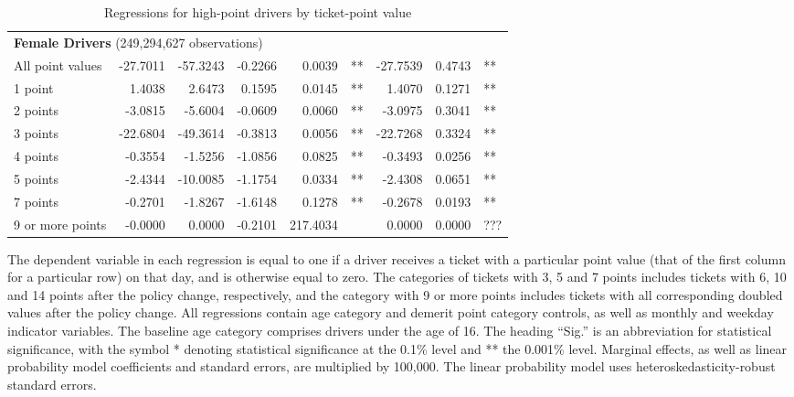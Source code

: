 \begin{table}
\begin{tabular}{l r r r r l r r l}
\hline 

\multicolumn{8}{l}{\textbf{Female Drivers} (249,294,627 observations)} \\ 

All point values                &  -27.7011        &  -57.3243       &  -0.2266        &  0.0039       &   **       &  -27.7539        &  0.4743       &   **       \\ 
1 point                         &  1.4038        &  2.6473       &  0.1595        &  0.0145       &   **       &  1.4070        &  0.1271       &   **       \\ 
2 points                        &  -3.0815        &  -5.6004       &  -0.0609        &  0.0060       &   **       &  -3.0975        &  0.3041       &   **       \\ 
3 points                        &  -22.6804        &  -49.3614       &  -0.3813        &  0.0056       &   **       &  -22.7268        &  0.3324       &   **       \\ 
4 points                        &  -0.3554        &  -1.5256       &  -1.0856        &  0.0825       &   **       &  -0.3493        &  0.0256       &   **       \\ 
5 points                        &  -2.4344        &  -10.0085       &  -1.1754        &  0.0334       &   **       &  -2.4308        &  0.0651       &   **       \\ 
7 points                        &  -0.2701        &  -1.8267       &  -1.6148        &  0.1278       &   **       &  -0.2678        &  0.0193       &   **       \\ 
9 or more points                &  -0.0000        &  0.0000       &  -0.2101        &  217.4034       &            &  0.0000        &  0.0000       &  ???       \\ 

\hline 

\end{tabular} 
\caption{Regressions for high-point drivers by ticket-point value} 
The dependent variable in each regression is equal to one  
if a driver receives a ticket with a particular point value   
(that of the first column for a particular row) on that day,  
and is otherwise equal to zero. 
The categories of tickets with 3, 5 and 7 points includes tickets  
with 6, 10 and 14 points after the policy change, respectively,  
and the category with 9 or more points includes tickets  
with all corresponding doubled values after the policy change. 
All regressions contain age category and demerit point category controls, 
as well as monthly and weekday indicator variables. 
The baseline age category comprises drivers under the age of 16. 
The heading ``Sig.'' is an abbreviation for statistical significance, with 
the symbol * denoting statistical significance at the 0.1\% level 
and ** the 0.001\% level. 
Marginal effects, as well as linear probability model coefficients and standard errors, are  
multiplied by 100,000.  
The linear probability model uses heteroskedasticity-robust standard errors.  
\label{tab:seas_Logit_vs_LPMx100K_high_pt_regs_by_points} 
\end{table} 
 

